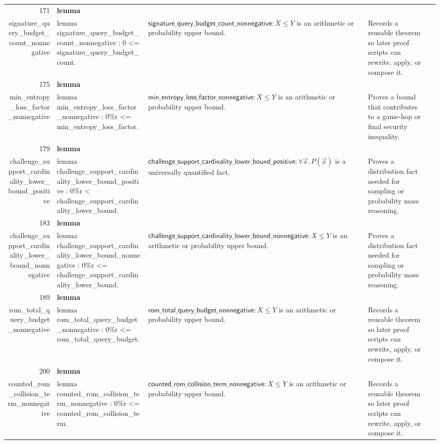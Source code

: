 \documentclass[10pt]{article}
\newcommand{\ec}[1]{\begingroup\ttfamily\scriptsize #1\endgroup}
\begin{document}
\begin{longtable}{r L{0.17\textwidth} L{0.26\textwidth} L{0.27\textwidth} L{0.20\textwidth}}
171 & \textbf{lemma}\\\ec{signature\_query\_budget\_count\_nonnegative} & \ec{lemma signature\_query\_budget\_count\_nonnegative : 0 <= signature\_query\_budget\_count.} & \(\mathsf{signature\_query\_budget\_count\_nonnegative} : X \le Y\) is an arithmetic or probability upper bound. & Records a reusable theorem so later proof scripts can rewrite, apply, or compose it. \\
175 & \textbf{lemma}\\\ec{min\_entropy\_loss\_factor\_nonnegative} & \ec{lemma min\_entropy\_loss\_factor\_nonnegative : 0\%r <= min\_entropy\_loss\_factor.} & \(\mathsf{min\_entropy\_loss\_factor\_nonnegative} : X \le Y\) is an arithmetic or probability upper bound. & Proves a bound that contributes to a game-hop or final security inequality. \\
179 & \textbf{lemma}\\\ec{challenge\_support\_cardinality\_lower\_bound\_positive} & \ec{lemma challenge\_support\_cardinality\_lower\_bound\_positive : 0\%r < challenge\_support\_cardinality\_lower\_bound.} & \(\mathsf{challenge\_support\_cardinality\_lower\_bound\_positive} : \forall \vec{x}.\, P(\vec{x})\) is a universally quantified fact. & Proves a distribution fact needed for sampling or probability mass reasoning. \\
183 & \textbf{lemma}\\\ec{challenge\_support\_cardinality\_lower\_bound\_nonnegative} & \ec{lemma challenge\_support\_cardinality\_lower\_bound\_nonnegative : 0\%r <= challenge\_support\_cardinality\_lower\_bound.} & \(\mathsf{challenge\_support\_cardinality\_lower\_bound\_nonnegative} : X \le Y\) is an arithmetic or probability upper bound. & Proves a distribution fact needed for sampling or probability mass reasoning. \\
189 & \textbf{lemma}\\\ec{rom\_total\_query\_budget\_nonnegative} & \ec{lemma rom\_total\_query\_budget\_nonnegative : 0\%r <= rom\_total\_query\_budget.} & \(\mathsf{rom\_total\_query\_budget\_nonnegative} : X \le Y\) is an arithmetic or probability upper bound. & Records a reusable theorem so later proof scripts can rewrite, apply, or compose it. \\
200 & \textbf{lemma}\\\ec{counted\_rom\_collision\_term\_nonnegative} & \ec{lemma counted\_rom\_collision\_term\_nonnegative : 0\%r <= counted\_rom\_collision\_term.} & \(\mathsf{counted\_rom\_collision\_term\_nonnegative} : X \le Y\) is an arithmetic or probability upper bound. & Records a reusable theorem so later proof scripts can rewrite, apply, or compose it. \\

\end{longtable}
\end{document}
